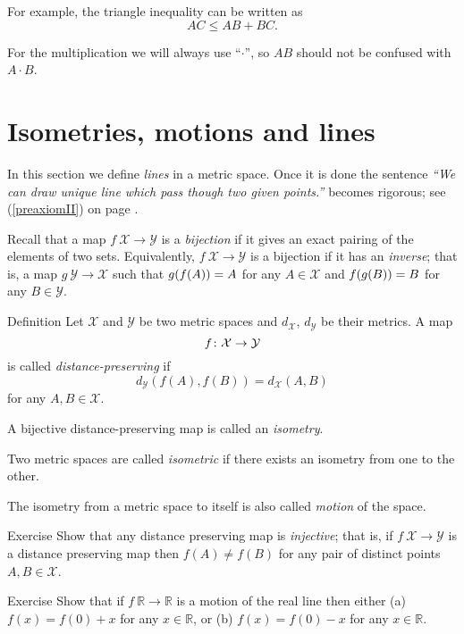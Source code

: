 For example, the triangle inequality can be written as 
$$AC\le AB+BC.$$

For the multiplication we will always use ``$\cdot$'',
so $AB$ should not be confused with $A\cdot B$.

\section*{Isometries, motions and lines}

In this section we define {}\emph{lines} in a metric space.
Once it is done the sentence  {}\emph{``We can draw unique line which pass though two given points.''} becomes rigorous; see (\ref{preaxiomII}) on page \pageref{preaxiomII}. 

Recall that a map $f\:\mathcal{X}\to\mathcal{Y}$
is a \emph{bijection} 
if it gives an exact pairing of the elements of two sets.
Equivalently, $f\:\mathcal{X}\to\mathcal{Y}$ is a bijection if it has an \emph{inverse};
that is, a map $g\:\mathcal{Y}\to\mathcal{X}$
such that 
$g(f(A))\z=A$   for any $A\in\mathcal{X}$
and
$f(g(B))\z=B$ for any $B\in\mathcal{Y}$. 

\begin{thm}{Definition}\label{def:isom}
Let $\mathcal X$ and $\mathcal Y$ be two metric spaces and $d_{\mathcal X}$, $d_{\mathcal Y}$ be their metrics. 
A map 
$$f\:\mathcal X \z\to \mathcal Y$$ 
is
called \emph{distance-preserving} if 
$$d_{\mathcal Y}(f(A), f(B))
 = d_{\mathcal X}(A,B)$$
for any $A,B\in {\mathcal X}$.

A bijective distance-preserving map is called an \emph{isometry}. 

Two metric spaces are called
\emph{isometric} if there exists an isometry from one to the other.

The isometry from a metric space to itself 
is also called \emph{motion} of the space.
\end{thm}

\begin{thm}{Exercise}\label{ex:dist-preserv=>injective}
Show that any distance preserving map  is \emph{injective};
that is, if $f\:\mathcal X\to\mathcal Y$ is a distance preserving map then
$f(A)\ne f(B)$
for any pair of distinct points $A,  B\in \mathcal X$.
\end{thm}

\begin{thm}{Exercise}\label{ex:motion-of-R}
Show that if $f\:\mathbb{R}\to\mathbb{R}$ is a motion of the real line 
then either (a)
$f(x)=f(0)+x$ for any $x\in \mathbb{R}$,  
or (b)
$f(x)=f(0)-x$ for any $x\in \mathbb{R}$. 

\end{thm}

